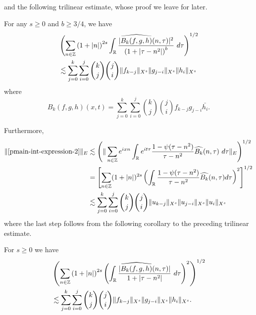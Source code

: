 %
%
and the following trilinear estimate, whose proof we leave for later.
%
%
%
%
%
%
%
%
\begin{proposition}
\label{pprop:trilinear-est}
  For any $s \ge 0$ and $b \ge 3/4$, we have
  \begin{equation}
    \begin{split}
    & \left( \sum_{n \in \mathbb{Z}} \left (1 + |n| \right )^{2s} \int_{\mathbb{R}}
    \frac{|\widehat{{B_k}(f,g,h)}(n, \tau) |^2}{\left (1+ |\tau - 
    n^{2}| \right ) ^b} 
     \ d \tau 
    \right)^{1/2}
    \\
    & \lesssim \sum_{j=0}^{k} \sum_{i=0}^{j} {k \choose j}{j \choose i}
    \|f_{k-j}\|_{X^s} \| g_{j-i}\|_{X^s}
    \| h_i \|_{X^s}
  \end{split}
  \end{equation}
  where $$B_k(f,g,h)(x,t) = \sum_{j=0}^{k} \sum_{i=0}^{j} {k \choose j}{j \choose
  i} f_{k-j} g_{j-i} \bar{h_i}.$$
%
%
%
%
\end{proposition}
%
%
Furthermore,
%
%
%
%
\begin{equation}
  \label{pmain-int-expression-2-Y-s-part}
  \begin{split}
    \|\eqref{pmain-int-expression-2} \|_{E}
    & \lesssim \left( \| \sum_{n \in \zz} e^{ixn} \int_\rr 
    e^{it \tau} \frac{ 1 - \psi (\tau - n^{2} ) 
    }{\tau - n^{2}} \wh{{B_k}}(n, \tau) \ 
    d \tau\|_{E} \right)^{1/2}
    \\
    & = \left[ \sum_{n \in \zz}(1 + | n |)^{2s} \left(
    \int_{\rr}\frac{1 - \psi(\tau - n^{2})}{\tau - n^{2}} \wh{{B_k}}(n, \tau) d
    \tau \right)^{2} \right]^{1/2}
    \\
    & \lesssim \sum_{j=0}^{k} \sum_{i=0}^{j} {k \choose j}{j \choose i}
    \|u_{k-j}\|_{X^s} \| u_{j-i}\|_{X^s}
    \| u_i \|_{X^s}
  \end{split}
\end{equation}
%
%
where the last step follows from the following corollary to the preceding trilinear
estimate.
%
%
%
%
%
%
%
%
\begin{corollary}
\label{pcor:trilinear-estimate2}
  For $s \ge 0$ we have
%
%
\begin{equation}
  \label{ptrilinear-estimate2}
  \begin{split}
    & \left( \sum_{n \in \mathbb{Z}} \left (1 + |n| \right )^{2s}  \left ( \int_{\mathbb{R}} 
    \frac{|\widehat{{B_k}(f,g,h)}(n, \tau) |}{1 + | \tau - n^{2} |}
     \ d\tau \right)^2  \right)^{1/2} 
     \\
     & \lesssim \sum_{j=0}^{k} \sum_{i=0}^{j} {k \choose j}{j \choose i}
    \|f_{k-j}\|_{X^s} \| g_{j-i}\|_{X^s}
    \| h_i \|_{X^s}.
  \end{split}
\end{equation}
\end{corollary}
